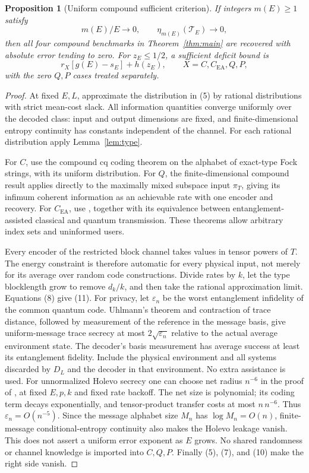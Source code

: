 \documentclass[11pt]{article}
\newtheorem{proposition}[theorem]{Proposition}
\newcommand{\CEA}{C_{\mathrm{EA}}}
\newcommand{\Tcal}{\mathcal T}
\begin{document}
\begin{proposition}[Uniform compound sufficient criterion]\label{prop:compound}
If integers \(m(E)\ge1\) satisfy
\[
 m(E)/E\longrightarrow0,\qquad
 \eta_{m(E)}(\Tcal_E)\longrightarrow0,                          \tag{10}
\]
then all four compound benchmarks in Theorem~\ref{thm:main} are recovered
with absolute error tending to zero.
For \(z_E\le1/2\), a sufficient deficit bound is
\[
 r_X[g(E)-s_E]+h(z_E),\qquad X=C,\CEA,Q,P,                      \tag{11}
\]
with the zero \(Q,P\) cases treated separately.
\end{proposition}
\begin{proof}
At fixed \(E,L\), approximate the distribution in (5) by rational
distributions with strict mean-cost slack.
All information quantities converge uniformly over the decoded class:
input and output dimensions are fixed, and finite-dimensional entropy
continuity has constants independent of the channel.
For each rational distribution apply Lemma~\ref{lem:type}.

For \(C\), use the compound cq coding theorem
\cite[Theorems III.1 and V.10]{cq} on the alphabet of exact-type Fock
strings, with its uniform distribution.
For \(Q\), the finite-dimensional compound result
\cite[Section 6.1, Lemma 16]{quantumcompound} applies directly to the
maximally mixed subspace input \(\pi_T\), giving its infimum coherent
information as an achievable rate with one encoder and recovery.
For \(\CEA\), use
\cite[Theorem 1 and Lemma 9]{eacompound}, together with its equivalence
between entanglement-assisted classical and quantum transmission.
These theorems allow arbitrary index sets and uninformed users.

Every encoder of the restricted block channel takes values in tensor
powers of \(T\). The energy constraint is therefore automatic for every
physical input, not merely for its average over random code constructions.
Divide rates by \(k\), let the type blocklength grow to remove \(d_k/k\),
and then take the rational approximation limit.
Equations (8) give (11).
For privacy, let \(\varepsilon_n\) be the worst entanglement infidelity
of the common quantum code. Uhlmann's theorem and contraction of trace
distance, followed by measurement of the reference in the message basis,
give uniform-message trace secrecy at most \(2\sqrt{\varepsilon_n}\)
relative to the actual average environment state. The decoder's basis
measurement has average success at least its entanglement fidelity.
Include the physical environment and all systems discarded by \(D_L\)
and the decoder in that environment. No extra assistance is used.
For unnormalized Holevo secrecy one can choose net radius \(n^{-6}\)
in the proof of \cite[Lemma 16 and Eq.~(34)]{quantumcompound}, at fixed
\(E,p,k\) and fixed rate backoff. The net size is polynomial; its coding
term decays exponentially, and tensor-product transfer costs at most
\(n\,n^{-6}\). Thus \(\varepsilon_n=O(n^{-5})\).
Since the message alphabet size \(M_n\) has \(\log M_n=O(n)\),
finite-message conditional-entropy continuity \cite[Lemma 2]{winter}
also makes the Holevo leakage vanish. This does not assert a uniform
error exponent as \(E\) grows. No shared randomness or channel knowledge
is imported into \(C,Q,P\).
Finally (5), (7), and (10) make the right side vanish.
\end{proof}
\end{document}
